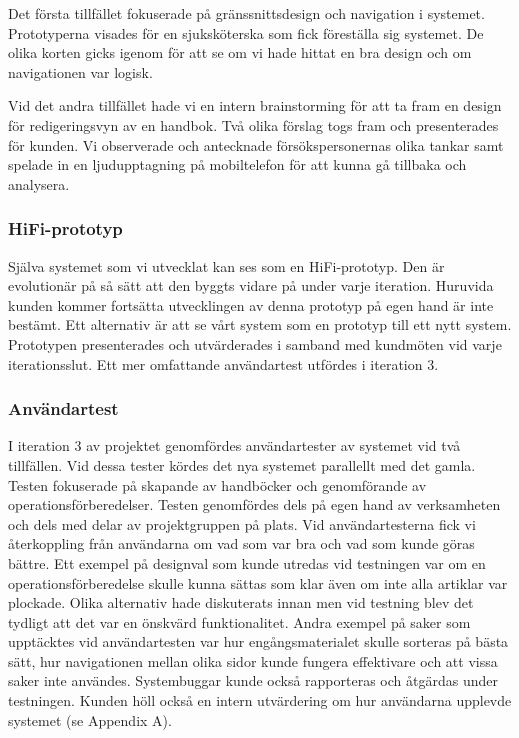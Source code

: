 Det första tillfället fokuserade på gränssnittsdesign och navigation i systemet. Prototyperna visades för en sjuksköterska som fick föreställa sig systemet. De olika korten gicks igenom för att se om vi hade hittat en bra design och om navigationen var logisk.

Vid det andra tillfället hade vi en intern brainstorming för att ta fram en design för redigeringsvyn av en handbok. Två olika förslag togs fram och presenterades för kunden. Vi observerade och antecknade försökspersonernas olika tankar samt spelade in en ljudupptagning på mobiltelefon för att kunna gå tillbaka och analysera.
\subsubsection{HiFi-prototyp}
Själva systemet som vi utvecklat kan ses som en HiFi-prototyp. Den är evolutionär på så sätt att den byggts vidare på under varje iteration. Huruvida kunden kommer fortsätta utvecklingen av denna prototyp på egen hand är inte bestämt. Ett alternativ är att se vårt system som en prototyp till ett nytt system. 
Prototypen presenterades och utvärderades i samband med kundmöten vid varje iterationsslut. Ett mer omfattande användartest utfördes i iteration 3.

\subsubsection{Användartest}
I iteration 3 av projektet genomfördes användartester av systemet vid två tillfällen. Vid dessa tester kördes det nya systemet parallellt med det gamla. Testen fokuserade på skapande av handböcker och genomförande av operationsförberedelser. Testen genomfördes dels på egen hand av verksamheten och dels med delar av projektgruppen på plats. Vid användartesterna fick vi återkoppling från användarna om vad som var bra och vad som kunde göras bättre. Ett exempel på designval som kunde utredas vid testningen var om en operationsförberedelse skulle kunna sättas som klar även om inte alla artiklar var plockade. Olika alternativ hade diskuterats innan men vid testning blev det tydligt att det var en önskvärd funktionalitet. Andra exempel på saker som upptäcktes vid användartesten var hur engångsmaterialet skulle sorteras på bästa sätt, hur navigationen mellan olika sidor kunde fungera effektivare och att vissa saker inte användes.
Systembuggar kunde också rapporteras och åtgärdas under testningen.
Kunden höll också en intern utvärdering om hur användarna upplevde systemet (se Appendix A).

